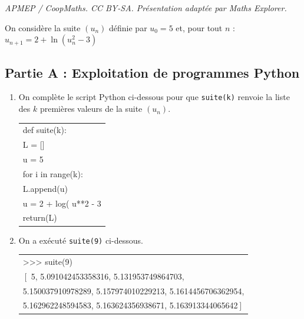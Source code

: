 \documentclass[10pt]{article}
\providecommand{\blue}{\color{blue}}
\providecommand{\blue}{\color{blue}}
\begin{document}
\noindent\textit{APMEP / CoopMaths. CC BY-SA. Présentation adaptée par Maths Explorer.}\par\medskip
\medskip
	On considère la suite $(u_{n})$ définie par $u_{0}=5$ et, pour tout $n$ :
$u_{n+1}=2+\ln \left(u_{n}^{2}-3\right)$



	\subsection*{Partie A : Exploitation de programmes Python}

	\begin{enumerate}
		\item On complète le script Python ci-dessous pour que \texttt{suite(k)}  renvoie la liste des $k$ premières valeurs de la suite $(u_{n})$.





		\begin{center}
		\begin{ttfamily}
		\begin{tabularx}{0.6\linewidth}{|X|}\hline
			def suite(k):\\
			\quad	L = []\\
			\quad	u = 5\\
			\quad	for i in range({\blue k}):\\
			\qquad	L.append(u)\\
			\qquad	u = \blue 2 + log( u**2 - 3\\
			\quad	return({\blue L})\\ \hline
		\end{tabularx}
		\end{ttfamily}
		\end{center}
		
		\item On a exécuté \texttt{suite(9)} ci-dessous. 
		


\begin{center}
\begin{ttfamily}
		
\begin{tabularx}{\linewidth}{|X|}\hline
>{}>{}>{} suite(9) \\
$\left[\right.$ 5, 5.091042453358316, 5.131953749864703,\\
5.150037910978289, 5.157974010229213, 5.1614456706362954,\\
5.162962248594583, 5.163624356938671, 5.163913344065642$\left.\right]$\\ \hline


\end{tabularx}
\end{ttfamily}
\end{center}
\end{enumerate}
\end{document}
